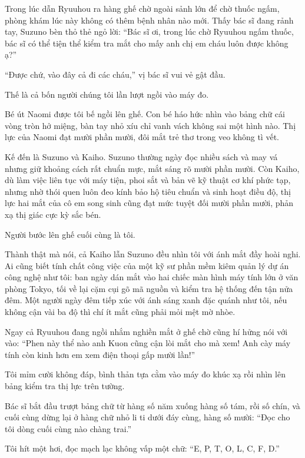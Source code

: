 ﻿\documentclass[../main.tex]{subfiles}
\begin{document}
\ct

Trong lúc dẫn Ryuuhou ra hàng ghế chờ ngoài sảnh lớn để chờ thuốc ngấm, phòng khám lúc này không có thêm bệnh nhân nào mới. Thấy bác sĩ đang rảnh tay, Suzuno bèn thỏ thẻ ngỏ lời: ``Bác sĩ ơi, trong lúc chờ Ryuuhou ngấm thuốc, bác sĩ có thể tiện thể kiểm tra mắt cho mấy anh chị em cháu luôn được không ạ?''

``Được chứ, vào đây cả đi các cháu,'' vị bác sĩ vui vẻ gật đầu.

Thế là cả bốn người chúng tôi lần lượt ngồi vào máy đo.

Bé út Naomi được tôi bế ngồi lên ghế. Con bé háo hức nhìn vào bảng chữ cái vòng tròn hở miệng, bàn tay nhỏ xíu chỉ vanh vách không sai một hình nào. Thị lực của Naomi đạt mười phần mười, đôi mắt trẻ thơ trong veo không tì vết.

Kế đến là Suzuno và Kaiho. Suzuno thường ngày đọc nhiều sách và may vá nhưng giữ khoảng cách rất chuẩn mực, mắt sáng rõ mười phần mười. Còn Kaiho, dù làm việc liên tục với máy tiện, phoi sắt và bản vẽ kỹ thuật cơ khí phức tạp, nhưng nhờ thói quen luôn đeo kính bảo hộ tiêu chuẩn và sinh hoạt điều độ, thị lực hai mắt của cô em song sinh cũng đạt mức tuyệt đối mười phần mười, phản xạ thị giác cực kỳ sắc bén.

Người bước lên ghế cuối cùng là tôi.

Thành thật mà nói, cả Kaiho lẫn Suzuno đều nhìn tôi với ánh mắt đầy hoài nghi. Ai cũng biết tính chất công việc của một kỹ sư phần mềm kiêm quản lý dự án công nghệ như tôi: ban ngày dán mắt vào hai chiếc màn hình máy tính lớn ở văn phòng Tokyo, tối về lại cặm cụi gõ mã nguồn và kiểm tra hệ thống đến tận nửa đêm. Một người ngày đêm tiếp xúc với ánh sáng xanh đặc quánh như tôi, nếu không cận vài ba độ thì chí ít mắt cũng phải mỏi mệt mờ nhòe.

Ngay cả Ryuuhou đang ngồi nhắm nghiền mắt ở ghế chờ cũng hí hửng nói với vào: ``Phen này thể nào anh Kuon cũng cận lòi mắt cho mà xem! Anh cày máy tính còn kinh hơn em xem điện thoại gấp mười lần!''

Tôi mỉm cười không đáp, bình thản tựa cằm vào máy đo khúc xạ rồi nhìn lên bảng kiểm tra thị lực trên tường.

Bác sĩ bắt đầu trượt bảng chữ từ hàng số năm xuống hàng số tám, rồi số chín, và cuối cùng dừng lại ở hàng chữ nhỏ li ti dưới đáy cùng, hàng số mười: ``Đọc cho tôi dòng cuối cùng nào chàng trai.''

Tôi hít một hơi, đọc mạch lạc không vấp một chữ: ``E, P, T, O, L, C, F, D.''
\end{document}
